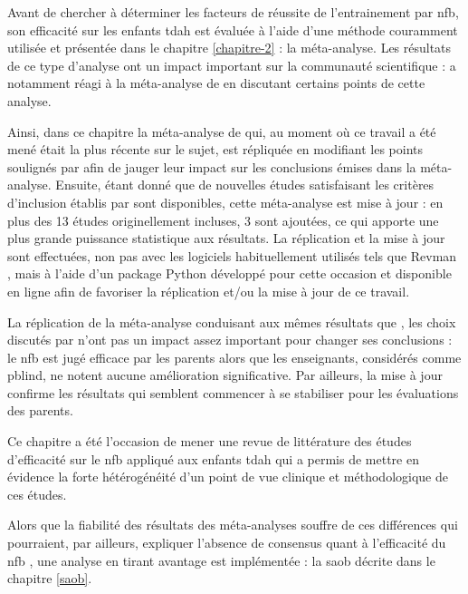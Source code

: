 Avant de chercher à déterminer les facteurs de réussite de l'entrainement par \gls{nfb}, son efficacité sur les enfants \gls{tdah} est évaluée à l'aide 
d'une méthode couramment utilisée \citep{Sonuga-Barke2013, Micoulaud2014, Cortese2016} et présentée dans le chapitre \ref{chapitre-2} : la méta-analyse. 
Les résultats de ce type d'analyse ont un impact important sur la communauté scientifique : \citet{Micoulaud2016} a notamment réagi à la méta-analyse de 
\citet{Cortese2016} en discutant certains points de cette analyse. 

Ainsi, dans ce chapitre la méta-analyse de \citet{Cortese2016} qui, au moment où ce travail a été mené était la plus récente sur le sujet, est répliquée en modifiant 
les points soulignés par \citet{Micoulaud2016} afin de jauger leur impact sur les conclusions émises dans la méta-analyse. Ensuite, étant donné que de nouvelles études 
satisfaisant les critères d'inclusion établis par \citet{Cortese2016} sont disponibles, cette méta-analyse est mise à jour : en plus des 13 études originellement incluses, 3
sont ajoutées, ce qui apporte une plus grande puissance statistique aux résultats. La réplication et la mise à jour sont effectuées, non pas avec les logiciels 
habituellement utilisés tels que Revman \citep{Revman}, mais à l'aide d'un package Python développé pour cette occasion et disponible en ligne afin de favoriser 
la réplication et/ou la mise à jour de ce travail. 

La réplication de la méta-analyse conduisant aux mêmes résultats que \citet{Cortese2016}, les choix discutés par \citet{Micoulaud2016} n'ont pas un impact assez
important pour changer ses conclusions : le \gls{nfb} est jugé efficace par les parents alors que les enseignants, considérés comme \gls{pblind}, ne notent aucune
amélioration significative. Par ailleurs, la mise à jour confirme les résultats qui semblent commencer à se stabiliser pour les évaluations des parents.

Ce chapitre a été l'occasion de mener une revue de littérature des études d'efficacité sur le \gls{nfb} appliqué aux enfants \gls{tdah} 
qui a permis de mettre en évidence la forte hétérogénéité d'un point de vue clinique et méthodologique de ces études. 

Alors que la fiabilité des résultats des méta-analyses souffre de ces différences qui pourraient, par ailleurs, expliquer l'absence de consensus quant 
à l'efficacité du \gls{nfb} \citep{Alkoby2017}, une analyse en tirant avantage est implémentée : la \gls{saob} décrite dans le chapitre \ref{saob}. 

